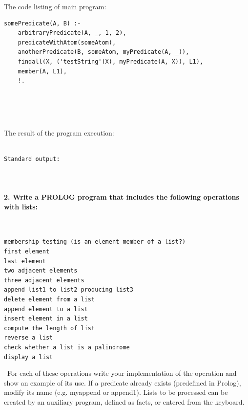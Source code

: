 \documentclass{article}
\begin{document}
		\rmfamily
		\noindent The code listing of main program:
		\begin{verbatim}
somePredicate(A, B) :-
    arbitraryPredicate(A, _, 1, 2),
    predicateWithAtom(someAtom),
    anotherPredicate(B, someAtom, myPredicate(A, _)),
    findall(X, ('testString'(X), myPredicate(A, X)), L1),
    member(A, L1),
    !.
		\end{verbatim}


\paragraph{}\
	
	\rmfamily\
	
		\noindent The result of the program execution:
		
	\ttfamily
	\begin{lstlisting}[language=bash]

Standard output:

	\end{lstlisting}
	
	
\paragraph{}\

	
	
	\rmfamily
	
	\paragraph{2. Write a PROLOG program that includes the following operations with lists: }\
	
	\ttfamily
	
	\begin{lstlisting}
membership testing (is an element member of a list?)
first element
last element
two adjacent elements
three adjacent elements
append list1 to list2 producing list3
delete element from a list
append element to a list
insert element in a list
compute the length of list
reverse a list
check whether a list is a palindrome
display a list
	\end{lstlisting}
	
	\rmfamily\
	For each of these operations write your implementation of the operation and show an example of its use. If a predicate already exists (predefined in Prolog), modify its name (e.g. myappend or append1).
	Lists to be processed can be created by an auxiliary program, defined as facts, or entered from the keyboard.
	\newline
	
\end{document}
